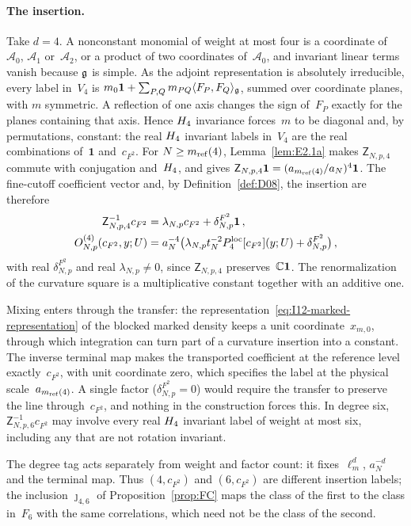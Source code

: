 \paragraph{The insertion.} Take $d=4$. A nonconstant monomial of weight at most four is a coordinate of~$\mathcal A_0$, $\mathcal A_1$ or~$\mathcal A_2$, or a product of two coordinates of~$\mathcal A_0$, and invariant linear terms vanish because $\mathfrak{g}$ is simple. As the adjoint representation is absolutely irreducible, every label in~$V_4$ is $m_0\mathbf1+\sum_{P,Q}m_{PQ}\langle F_P,F_Q\rangle_{\mathfrak{g}}$, summed over coordinate planes, with $m$ symmetric. A reflection of one axis changes the sign of~$F_P$ exactly for the planes containing that axis. Hence $H_4$ invariance forces~$m$ to be diagonal and, by permutations, constant: the real $H_4$ invariant labels in~$V_4$ are the real combinations of~$\mathbf1$ and~$c_{F^2}$. For $N\ge m_{\mathrm{ref}}(4)$, Lemma~\ref{lem:E2.1a} makes $\mathsf Z_{N,p,4}$ commute with conjugation and~$H_4$, and gives $\mathsf Z_{N,p,4}\mathbf1=(a_{m_{\mathrm{ref}}(4)}/a_N)^4\mathbf1$. The fine-cutoff coefficient vector and, by Definition~\ref{def:D08}, the insertion are therefore
\begin{align*}
\mathsf Z_{N,p,4}^{-1}c_{F^2}&=\lambda_{N,p}c_{F^2}+\delta^{F^2}_{N,p}\mathbf1\,,\\
O^{(4)}_{N,p}(c_{F^2},y;U)&=a_N^{-4}\bigl(\lambda_{N,p}t_N^{-2}P_{4}^{\mathrm{loc}}[c_{F^2}](y;U)+\delta^{F^2}_{N,p}\bigr)\,,
\end{align*}
with real $\delta^{F^2}_{N,p}$ and real $\lambda_{N,p}\ne0$, since $\mathsf Z_{N,p,4}$ preserves~$\mathbb{C}\mathbf1$. The renormalization of the curvature square is a multiplicative constant together with an additive one.

Mixing enters through the transfer: the representation~\eqref{eq:I12-marked-representation} of the blocked marked density keeps a unit coordinate~$x_{m,0}$, through which integration can turn part of a curvature insertion into a constant. The inverse terminal map makes the transported coefficient at the reference level exactly~$c_{F^2}$, with unit coordinate zero, which specifies the label at the physical scale~$a_{m_{\mathrm{ref}}(4)}$. A single factor ($\delta^{F^2}_{N,p}=0$) would require the transfer to preserve the line through~$c_{F^2}$, and nothing in the construction forces this. In degree six, $\mathsf Z_{N,p,6}^{-1}c_{F^2}$ may involve every real $H_4$ invariant label of weight at most six, including any that are not rotation invariant.

The degree tag acts separately from weight and factor count: it fixes~$\ell_m^d$, $a_N^{-d}$ and the terminal map. Thus $(4,c_{F^2})$ and $(6,c_{F^2})$ are different insertion labels; the inclusion $\jmath_{4,6}$ of Proposition~\ref{prop:FC} maps the class of the first to the class in~$F_6$ with the same correlations, which need not be the class of the second.

